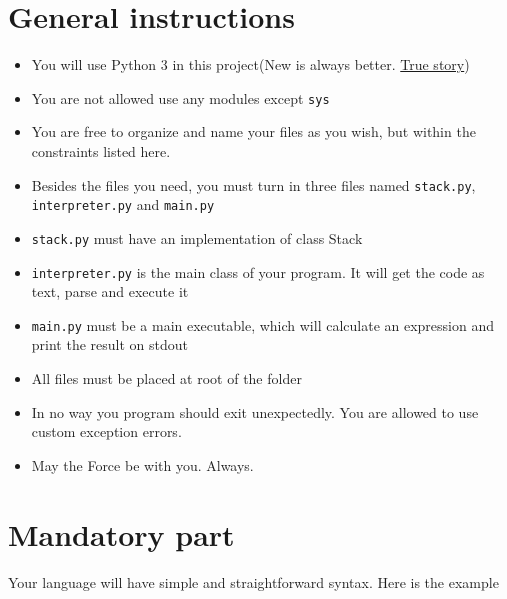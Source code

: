 \documentclass{42-en}
\begin{document}
\chapter{General instructions}

    \begin{itemize}\itemsep1pt
        \item You will use Python 3 in this project(New is always better. \href{https://en.wikipedia.org/wiki/Barney_Stinson}{True story})
        \item You are not allowed use any modules except \texttt{sys}
        \item You are free to organize and name your files as you wish,
        but within the constraints listed here.
        \item Besides the files you need, you must turn in three files named
        \texttt{stack.py}, \texttt{interpreter.py} and \texttt{main.py}
        \item \texttt{stack.py} must have an implementation of class Stack
        \item \texttt{interpreter.py} is the main class of your program. It will get the 
        code as text, parse and execute it
        \item \texttt{main.py} must be a main executable, which will calculate an 
        expression and print the result on stdout
        \item All files must be placed at root of the folder
        \item In no way you program should exit unexpectedly. You are allowed to use
        custom exception errors.
        \item May the Force be with you. Always.
    \end{itemize}

\chapter{Mandatory part}

    Your language will have simple and straightforward syntax. Here is the example
    
\end{document}
